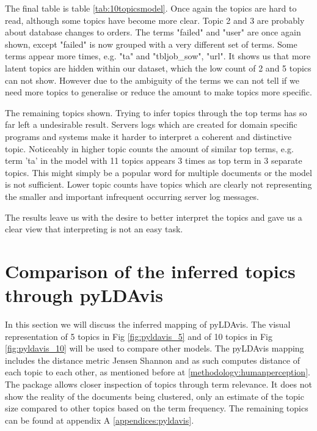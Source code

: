 The final table is table \ref{tab:10topicsmodel}. Once again the topics are hard to read, although some topics have become more clear. Topic 2 and 3 are probably about database changes to orders. The terms "failed" and "user" are once again shown, except "failed" is now grouped with a very different set of terms. Some terms appear more times, e.g. "ta" and "tbljob\_sow", "url". It shows us that more latent topics are hidden within our dataset, which the low count of 2 and 5 topics can not show. However due to the ambiguity of the terms we can not tell if we need more topics to generalise or reduce the amount to make topics more specific.

The remaining topics shown. Trying to infer topics through the top terms has so far left a undesirable result. Servers logs which are created for domain specific programs and systems make it harder to interpret a coherent and distinctive topic. Noticeably in higher topic counts the amount of similar top terms, e.g. term 'ta' in the model with 11 topics appears 3 times as top term in 3 separate topics. This might simply be a popular word for multiple documents or the model is not sufficient. Lower topic counts have topics which are clearly not representing the smaller and important infrequent occurring server log messages.

The results leave us with the desire to better interpret the topics and gave us a clear view that interpreting is not an easy task.

\FloatBarrier
\section{Comparison of the inferred topics through pyLDAvis}\label{results:pyldavis}
In this section we will discuss the inferred mapping of pyLDAvis. The visual representation of 5 topics in Fig \ref{fig:pyldavis_5} and of 10 topics in Fig \ref{fig:pyldavis_10} will be used to compare other models. The pyLDAvis mapping includes the distance metric Jensen Shannon and as such computes distance of each topic to each other, as mentioned before at \ref{methodology:humanperception}. The package allows closer inspection of topics through term relevance. It does not show the reality of the documents being clustered, only an estimate of the topic size compared to other topics based on the term frequency. The remaining topics can be found at appendix A \ref{appendices:pyldavis}. 

